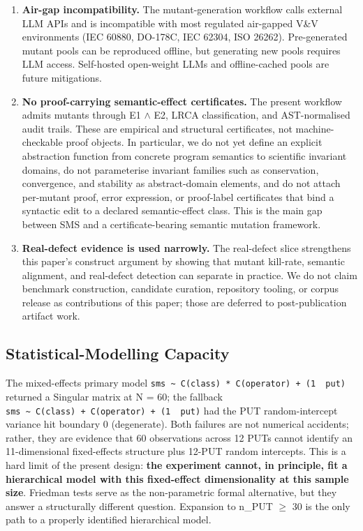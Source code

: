 \documentclass[12pt]{article}
\begin{document}
\begin{enumerate}
  semantic complexity. A portability study should validate SMS on
  industrial-grade multi-output PUTs.
\item
  \textbf{Air-gap incompatibility.} The mutant-generation workflow calls
  external LLM APIs and is incompatible with most regulated air-gapped
  V\&V environments (IEC 60880, DO-178C, IEC 62304, ISO 26262).
  Pre-generated mutant pools can be reproduced offline, but generating
  new pools requires LLM access. Self-hosted open-weight LLMs and
  offline-cached pools are future mitigations.
\item
  \textbf{No proof-carrying semantic-effect certificates.} The present
  workflow admits mutants through E1 $\wedge$ E2, LRCA classification, and
  AST-normalised audit trails. These are empirical and structural
  certificates, not machine-checkable proof objects. In particular, we
  do not yet define an explicit abstraction function from concrete
  program semantics to scientific invariant domains, do not parameterise
  invariant families such as conservation, convergence, and stability as
  abstract-domain elements, and do not attach per-mutant proof, error
  expression, or proof-label certificates that bind a syntactic edit to
  a declared semantic-effect class. This is the main gap between SMS and
  a certificate-bearing semantic mutation framework.
\item
  \textbf{Real-defect evidence is used narrowly.} The real-defect slice
  strengthens this paper's construct argument by showing that mutant
  kill-rate, semantic alignment, and real-defect detection can separate
  in practice. We do not claim benchmark construction, candidate curation,
  repository tooling, or corpus release as contributions of this paper;
  those are deferred to post-publication artifact work.
\end{enumerate}

\subsection{Statistical-Modelling Capacity}\label{statistical-modelling-capacity-at-n-60-cells-12-puts}

The mixed-effects primary model
\texttt{sms\ \textasciitilde{}\ C(class)\ *\ C(operator)\ +\ (1\ \textbar{}\ put)}
returned a Singular matrix at N = 60; the fallback
\texttt{sms\ \textasciitilde{}\ C(class)\ +\ C(operator)\ +\ (1\ \textbar{}\ put)}
had the PUT random-intercept variance hit boundary 0 (degenerate). Both
failures are not numerical accidents; rather, they are evidence that 60
observations across 12 PUTs cannot identify an 11-dimensional
fixed-effects structure plus 12-PUT random intercepts. This is a hard
limit of the present design: \textbf{the experiment cannot, in
principle, fit a hierarchical model with this fixed-effect
dimensionality at this sample size}. Friedman tests serve as the
non-parametric formal alternative, but they answer a structurally
different question. Expansion to n\_PUT $\geq$ 30 is the only path to a
properly identified hierarchical model.
\end{document}
